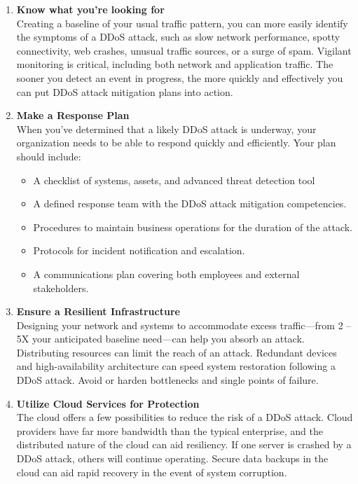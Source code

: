 \documentclass[a4paper, 12pt]{report} %
\begin{document}
                    \begin{enumerate}
                        \item \textbf{Know what you're looking for} \\ Creating a baseline of your usual traffic pattern, you can more easily identify the symptoms of a DDoS attack, such as slow network performance, spotty connectivity, web crashes, unusual traffic sources, or a surge of spam. Vigilant monitoring is critical, including both network and application traffic. The sooner you detect an event in progress, the more quickly and effectively you can put DDoS attack mitigation plans into action.

                        \item \textbf{Make a Response Plan} \\ When you’ve determined that a likely DDoS attack is underway, your organization needs to be able to respond quickly and efficiently. Your plan should include:
                        \begin{itemize}
                            \item A checklist of systems, assets, and advanced threat detection tool
                            \item A defined response team with the DDoS attack mitigation competencies.
                            \item Procedures to maintain business operations for the duration of the attack.
                            \item Protocols for incident notification and escalation.
                            \item A communications plan covering both employees and external stakeholders.
                        \end{itemize}
                        \item \textbf{Ensure a Resilient Infrastructure} \\ Designing your network and systems to accommodate excess traffic—from 2 – 5X your anticipated baseline need—can help you absorb an attack. Distributing resources can limit the reach of an attack. Redundant devices and high-availability architecture can speed system restoration following a DDoS attack. Avoid or harden bottlenecks and single points of failure.

                        \item \textbf{Utilize Cloud Services for Protection} \\ The cloud offers a few possibilities to reduce the risk of a DDoS attack. Cloud providers have far more bandwidth than the typical enterprise, and the distributed nature of the cloud can aid resiliency. If one server is crashed by a DDoS attack, others will continue operating. Secure data backups in the cloud can aid rapid recovery in the event of system corruption.


\end{enumerate}
\end{document}
